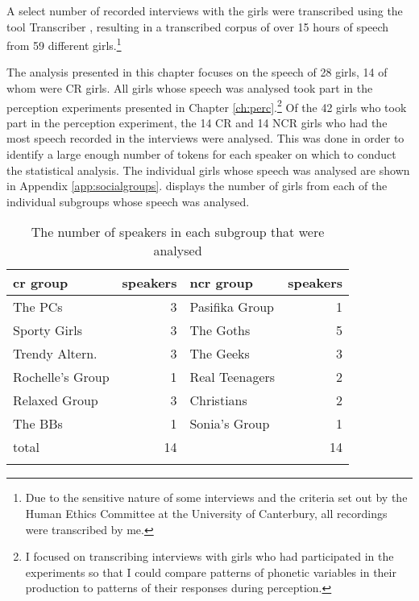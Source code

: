 A select number of recorded interviews with the girls were transcribed using the tool Transcriber \citep{Transcriber-SpeechComm2000}, resulting in a transcribed corpus of over 15 hours of speech from 59 different girls.\footnote{Due to the sensitive nature of some interviews and the criteria set out by the Human Ethics Committee at the University of Canterbury, all recordings were transcribed by me.} 
\nocite{Transcriber-SpeechComm2000}

The analysis presented in this chapter focuses on the speech of 28 girls, 14 of whom were CR girls. All girls whose speech was analysed took part in the perception experiments presented in Chapter \ref{ch:perc}.\footnote{I focused on transcribing interviews with girls who had participated in the experiments so that I could compare patterns of phonetic variables in their production to patterns of their responses during perception.} Of the 42 girls who took part in the perception experiment, the 14 CR and 14 NCR girls who had the most speech recorded in the interviews were analysed. This was done in order to identify a large enough number of tokens for each speaker on which to conduct the statistical analysis.  The individual girls whose speech was analysed are shown in Appendix \ref{app:socialgroups}.   displays the number of girls from each of the individual subgroups whose speech was analysed.

\begin{table}[htbp]
\caption{The number of speakers in each subgroup that were analysed}	
	\label{tab:groupsprod}
	 \begin{center}
		\begin{tabular}{lrlr}
		\lsptoprule
		\sc cr group & \sc speakers & \sc ncr group & \sc speakers \\
 \midrule
The PCs & 3       &Pasifika Group & 1  \\
Sporty Girls & 3  &The Goths & 5 \\
Trendy Altern. & 3  &The Geeks & 3  \\
Rochelle's Group & 1   &Real Teenagers & 2 \\
Relaxed Group & 3      &Christians & 2 \\
The BBs & 1        &Sonia's Group & 1  \\\midrule
\sc total & 14  & & 14  \\

\lspbottomrule
		\end{tabular}
	
	\end{center}
\end{table} 


